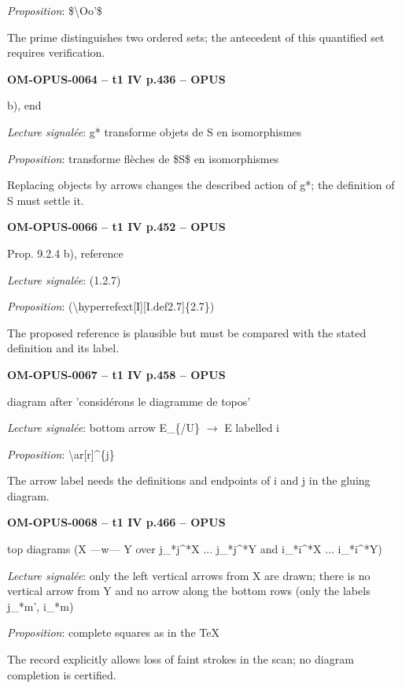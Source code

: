 \emph{Proposition}: \$\textbackslash{}Oo'\$\par
The prime distinguishes two ordered sets; the antecedent of this quantified set requires verification.\par
\par\noindent\textbf{OM-OPUS-0064 -- t1 IV p.436 -- OPUS}\par
b), end\par
\emph{Lecture signalée}: g* transforme objets de S en isomorphismes\par
\emph{Proposition}: transforme flèches de \$S\$ en isomorphismes\par
Replacing objects by arrows changes the described action of g*; the definition of S must settle it.\par
\par\noindent\textbf{OM-OPUS-0066 -- t1 IV p.452 -- OPUS}\par
Prop. 9.2.4 b), reference\par
\emph{Lecture signalée}: (1.2.7)\par
\emph{Proposition}: (\textbackslash{}hyperrefext[I][I.def2.7]\{2.7\})\par
The proposed reference is plausible but must be compared with the stated definition and its label.\par
\par\noindent\textbf{OM-OPUS-0067 -- t1 IV p.458 -- OPUS}\par
diagram after 'considérons le diagramme de topos'\par
\emph{Lecture signalée}: bottom arrow E\_\{/U\} \ensuremath{\to} E labelled i\par
\emph{Proposition}: \textbackslash{}ar[r]\textasciicircum{}\{j\}\par
The arrow label needs the definitions and endpoints of i and j in the gluing diagram.\par
\par\noindent\textbf{OM-OPUS-0068 -- t1 IV p.466 -- OPUS}\par
top diagrams (X —w— Y over j\_*j\textasciicircum{}*X ... j\_*j\textasciicircum{}*Y and i\_*i\textasciicircum{}*X ... i\_*i\textasciicircum{}*Y)\par
\emph{Lecture signalée}: only the left vertical arrows from X are drawn; there is no vertical arrow from Y and no arrow along the bottom rows (only the labels j\_*m', i\_*m)\par
\emph{Proposition}: complete squares as in the TeX\par
The record explicitly allows loss of faint strokes in the scan; no diagram completion is certified.\par
